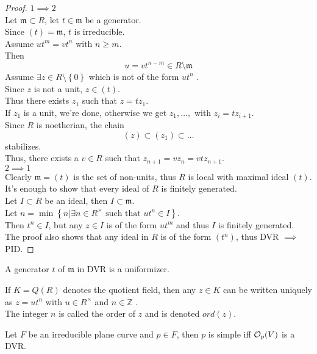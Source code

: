 \documentclass[../main.tex]{subfiles}
\begin{document}
\begin{proof}
	$1 \implies 2$\\ Let $\mathfrak{m} \subset R$, let $t\in \mathfrak{m}$ be a generator.\\
	Since $ ( t) = \mathfrak{m}$, $t$ is irreducible.\\
	Assume $u t^{m}= v t^{n}$ with $n \geq m$.\\
	Then
	\[ 
		u = v t^{n-m}\in R \setminus  \mathfrak{m}
	\]
	Assume $\exists z \in R \setminus \left\{ 0 \right\}  $ which is not of the form $ u t^{n}$ .\\
	Since $z$ is not a unit, $z\in ( t) $.\\
	Thus there exists $z_1$ such that $z= t z_1$.\\
	If $z_1$ is a unit, we're  done, otherwise we get $z_1,\ldots,$ with $z_i= t z_{i+1} $.\\
	Since $R$ is noetherian, the chain
	\[ 
		( z) \subset ( z_1) \subset \ldots	
	\]
	stabilizes.\\
	Thus, there exists a $v\in R$ such that $z_{n+1} = vz_n = vt z_{n+1} $.\\
	$2\implies 1$\\
	Clearly $\mathfrak m = ( t) $ is the set of non-units, thus $R$ is local with maximal ideal $( t) $.\\
	It's enough to show that every ideal of $R$ is finitely generated.\\
	Let $I \subset R$ be an ideal, then $I \subset \mathfrak m$.\\
	Let $n = \min \left\{ n | \exists n \in R^{\times} \text{ such that } u t^{n} \in I\right\} $.\\
	Then $t^{n}\in I$, but any $z\in I$ is of the form $ut^{m}$ and thus $I$ is finitely generated.\\
	The proof also shows that any ideal in $R$ is of the form $( t^{n}) $, thus DVR $\implies $ PID.
\end{proof}
\begin{defn}[uniformizer]
	A generator $t$ of $\mathfrak m$ in DVR is a uniformizer.
\end{defn}
If $K= Q( R) $ denotes the quotient field, then any $z\in K$ can be written uniquely as $z= u t^{n}$ with $u \in R^{\times}$ and $n \in \mathbb{Z}$ .\\
The integer $n$ is called the order of $z$ and is denoted $ord( z) $.
\begin{crly}
Let $F$ be an irreducible plane curve and $p \in F$, then $p$ is simple iff $\mathcal{O}_p( V) $ is a DVR.
\end{crly}
\end{document}
